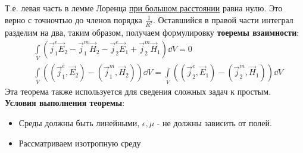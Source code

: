 Т.е. левая часть в лемме Лоренца \underline{при большом расстоянии} равна нулю. Это верно с точночтью до членов порядка
$\frac{1}{R^2}$. Оставшийся в правой части интеграл разделим на два, таким образом, получаем
формулировку \textbf{тоеремы взаимности}:
\begin{align*}
	&\int \limits_V \left( \vec{j}^{e}_1 \vec{E}_2-\vec{j}^{m}_1 \vec{H}_2-\vec{j}^{e}_2 \vec{E}_1+\vec{j}^{m}_2 \vec{H}_1 \right) \dd V = 0\\
	&\int \limits_V \left( (\vec{j}^{e}_1,\vec{E}_2)-(\vec{j}^{m}_1,\vec{H}_2)\right) \dd V = \int \limits_V\left( (\vec{j}^{e}_2,\vec{E}_1)-(\vec{j}^{m}_2,\vec{H}_1) \right) \dd V
\end{align*}
Эта теорема также используется для сведения сложных задач к простым. \textbf{Условия выполнения теоремы}:
\begin{itemize}
	\item Среды должны быть линейными, $\epsilon,\mu$ - не должны зависить от полей.
	\item Рассматриваем изотропную среду
\end{itemize}
